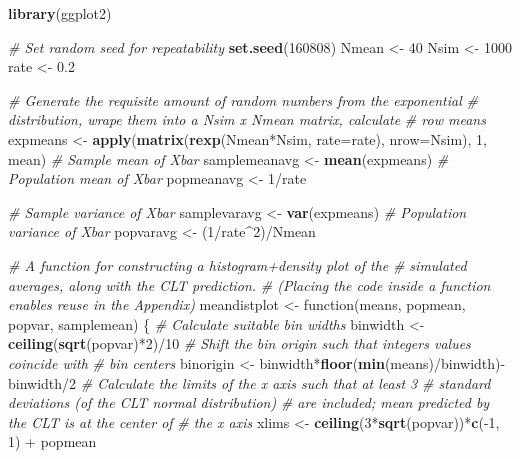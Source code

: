 \documentclass[12pt,a4paper]{article}
\newenvironment{Shaded}{\begin{snugshade}}{\end{snugshade}}
\newcommand{\KeywordTok}[1]{\textcolor[rgb]{0.13,0.29,0.53}{\textbf{{#1}}}}
\newcommand{\DataTypeTok}[1]{\textcolor[rgb]{0.13,0.29,0.53}{{#1}}}
\newcommand{\DecValTok}[1]{\textcolor[rgb]{0.00,0.00,0.81}{{#1}}}
\newcommand{\FloatTok}[1]{\textcolor[rgb]{0.00,0.00,0.81}{{#1}}}
\newcommand{\StringTok}[1]{\textcolor[rgb]{0.31,0.60,0.02}{{#1}}}
\newcommand{\CommentTok}[1]{\textcolor[rgb]{0.56,0.35,0.01}{\textit{{#1}}}}
\newcommand{\NormalTok}[1]{{#1}}
\begin{document}
\begin{Shaded}
\begin{Highlighting}[]
\KeywordTok{library}\NormalTok{(ggplot2)}

\CommentTok{# Set random seed for repeatability}
\KeywordTok{set.seed}\NormalTok{(}\DecValTok{160808}\NormalTok{)}
\NormalTok{Nmean <-}\StringTok{ }\DecValTok{40}
\NormalTok{Nsim <-}\StringTok{ }\DecValTok{1000}
\NormalTok{rate <-}\StringTok{ }\FloatTok{0.2}

\CommentTok{# Generate the requisite amount of random numbers from the exponential}
\CommentTok{# distribution, wrape them into a Nsim x Nmean matrix, calculate}
\CommentTok{# row means}
\NormalTok{expmeans <-}\StringTok{ }\KeywordTok{apply}\NormalTok{(}\KeywordTok{matrix}\NormalTok{(}\KeywordTok{rexp}\NormalTok{(Nmean*Nsim, }\DataTypeTok{rate=}\NormalTok{rate), }\DataTypeTok{nrow=}\NormalTok{Nsim),}
                  \DecValTok{1}\NormalTok{, mean)}
\CommentTok{# Sample mean of Xbar}
\NormalTok{samplemeanavg <-}\StringTok{ }\KeywordTok{mean}\NormalTok{(expmeans)}
\CommentTok{# Population mean of Xbar}
\NormalTok{popmeanavg <-}\StringTok{ }\DecValTok{1}\NormalTok{/rate}

\CommentTok{# Sample variance of Xbar}
\NormalTok{samplevaravg <-}\StringTok{ }\KeywordTok{var}\NormalTok{(expmeans)}
\CommentTok{# Population variance of Xbar}
\NormalTok{popvaravg <-}\StringTok{ }\NormalTok{(}\DecValTok{1}\NormalTok{/rate^}\DecValTok{2}\NormalTok{)/Nmean}

\CommentTok{# A function for constructing a histogram+density plot of the}
\CommentTok{# simulated averages, along with the CLT prediction.}
\CommentTok{# (Placing the code inside a function enables reuse in the Appendix)}
\NormalTok{meandistplot <-}\StringTok{ }\NormalTok{function(means, popmean, popvar, samplemean)}
\NormalTok{\{}
    \CommentTok{# Calculate suitable bin widths}
    \NormalTok{binwidth <-}\StringTok{ }\KeywordTok{ceiling}\NormalTok{(}\KeywordTok{sqrt}\NormalTok{(popvar)*}\DecValTok{2}\NormalTok{)/}\DecValTok{10}
    \CommentTok{# Shift the bin origin such that integers values coincide with}
    \CommentTok{# bin centers}
    \NormalTok{binorigin <-}\StringTok{ }\NormalTok{binwidth*}\KeywordTok{floor}\NormalTok{(}\KeywordTok{min}\NormalTok{(means)/binwidth)-binwidth/}\DecValTok{2}
    \CommentTok{# Calculate the limits of the x axis such that at least 3}
    \CommentTok{# standard deviations (of the CLT normal distribution)}
    \CommentTok{# are included; mean predicted by the CLT is at the center of}
    \CommentTok{# the x axis}
    \NormalTok{xlims <-}\StringTok{ }\KeywordTok{ceiling}\NormalTok{(}\DecValTok{3}\NormalTok{*}\KeywordTok{sqrt}\NormalTok{(popvar))*}\KeywordTok{c}\NormalTok{(-}\DecValTok{1}\NormalTok{, }\DecValTok{1}\NormalTok{) +}\StringTok{ }\NormalTok{popmean}
    

\end{Highlighting}
\end{Shaded}
\end{document}
